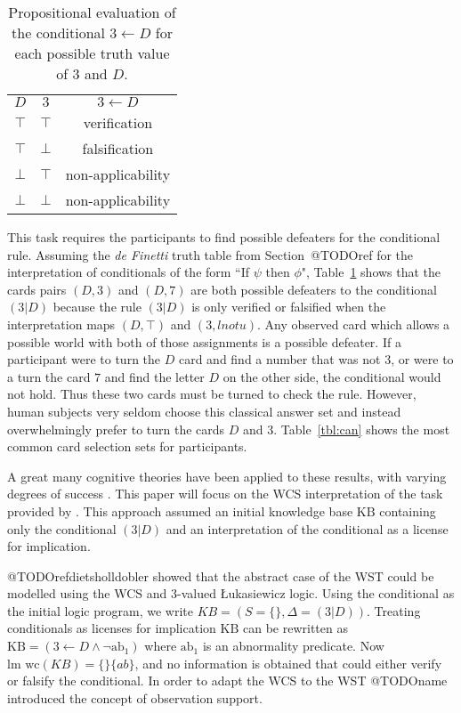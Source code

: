 \begin{table}
\begin{center}


\begin{tabular}{ c c c}
  \textbf{$D$}&  \textbf{$3$}& \textbf{$3\leftarrow D$} \\ 
 $\top$ & $\top$ & verification\\  
 $\top$ & $\bot$ & falsification\\  
 $\bot$ & $\top$ & non-applicability\\
 $\bot$ & $\bot$ & non-applicability
\end{tabular}
\caption{Propositional evaluation of the conditional $3 \leftarrow D$ for each possible truth value of $3$ and $D$.}
\label{tbl:wst_classical}
\end{center}
\end{table}


This task requires the participants to find possible defeaters for the conditional rule. Assuming the \textit{de Finetti} truth table from Section~@TODOref for the interpretation of conditionals of the form ``If $\psi$ then $\phi$", Table~\ref{tbl:wst_classical} shows that the cards pairs $(D,3)$ and $(D,7)$ are both possible defeaters to the conditional $(3|D)$ because the rule $(3|D)$ is only verified or falsified when the interpretation maps $(D,\top)$ and $(3, lnot u)$. Any observed card which allows a possible world with both of those assignments is a possible defeater. If a participant were to turn the $D$ card and find a number that was not $3$, or were to a turn the card $7$ and find the letter $D$ on the other side, the conditional would not hold. Thus these two cards must be turned to check the rule. However, human subjects very seldom choose this classical answer set and instead overwhelmingly prefer to turn the cards $D$ and $3$. Table~\ref{tbl:can} shows the most common card selection sets for participants.

A great many cognitive theories have been applied to these results, with varying degrees of success \cite{ragni2017formal}. This paper will focus on the WCS interpretation of the task provided by \citep{ragni2017wason}. This approach assumed an initial knowledge base $\text{KB}$ containing only the conditional $(3|D)$ and an interpretation of the conditional as a license for implication.

@TODOrefdietsholldobler showed that the abstract case of the WST could be modelled using the WCS and 3-valued \L ukasiewicz logic. Using the conditional as the initial logic program, we write $KB=(S=\{\},\Delta=(3|D))$. Treating conditionals as licenses for implication $\text{KB}$ can be rewritten as $\text{KB}=(3\leftarrow D \land \lnot \text{ab}_1)$ where $\text{ab}_1$ is an abnormality predicate. Now $\textrm{lm wc}(KB)=\{\}\{ab\}$, and no information is obtained that could either verify or falsify the conditional. In order to adapt the WCS to the WST @TODOname introduced the concept of observation support.

